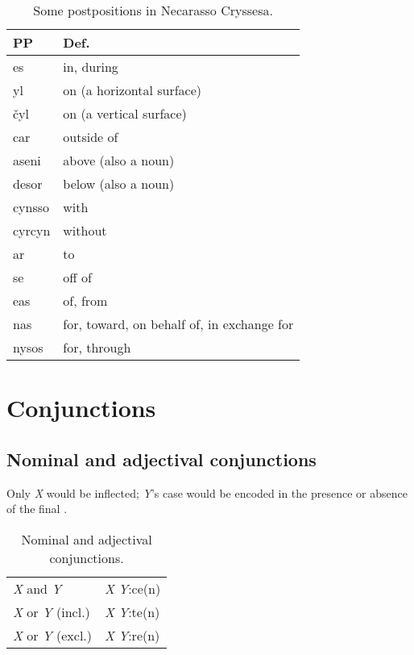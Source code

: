 \documentclass{book}
\begin{document}
\begin{table}[h]
  \caption{Some postpositions in Necarasso Cryssesa.}
  \centering
  \begin{tabu} to \linewidth {|l|X|}
    \hline
    PP & Def. \\
    \hline
    es & in, during \\
    yl & on (a horizontal surface) \\
    čyl & on (a vertical surface) \\
    car & outside of \\
    aseni & above (also a noun) \\
    desor & below (also a noun) \\
    cynsso & with \\
    cyrcyn & without \\
    ar & to \\
    se & off of \\
    eas & of, from \\
    nas & for, toward, on behalf of, in exchange for \\
    nysos & for, through \\
    \hline
  \end{tabu}
\end{table}

\chapter{Conjunctions}

\section{Nominal and adjectival conjunctions}

Only \emph{X} would be inflected; \emph{Y}'s case would be encoded in the presence or absence of the final .

\begin{table}[ht]
  \caption{Nominal and adjectival conjunctions.}
  \centering
	\begin{tabular}{|l|l|}
	  \hline
	  \emph{X} and \emph{Y} & \emph{X} \emph{Y}:ce(n) \\
	  \emph{X} or \emph{Y} (incl.) & \emph{X} \emph{Y}:te(n) \\
	  \emph{X} or \emph{Y} (excl.) & \emph{X} \emph{Y}:re(n) \\ \hline
	\end{tabular}
\end{table}
\end{document}
